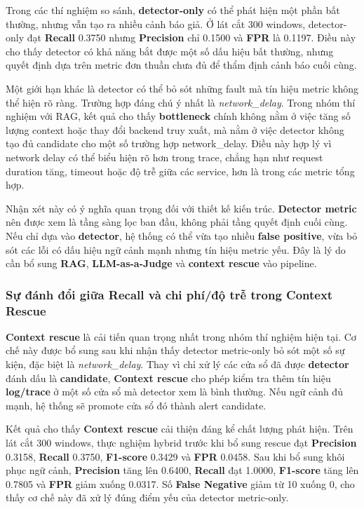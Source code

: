 Trong các thí nghiệm so sánh, \textbf{detector-only} có thể phát hiện một phần bất thường, nhưng vẫn tạo ra nhiều cảnh báo giả. Ở lát cắt 300 windows, detector-only đạt \textbf{Recall} 0.3750 nhưng \textbf{Precision} chỉ 0.1500 và \textbf{FPR} là 0.1197. Điều này cho thấy detector có khả năng bắt được một số dấu hiệu bất thường, nhưng quyết định dựa trên metric đơn thuần chưa đủ để thẩm định cảnh báo cuối cùng.

Một giới hạn khác là detector có thể bỏ sót những fault mà tín hiệu metric không thể hiện rõ ràng. Trường hợp đáng chú ý nhất là \textit{network\_delay}. Trong nhóm thí nghiệm với RAG, kết quả cho thấy \textbf{bottleneck} chính không nằm ở việc tăng số lượng context hoặc thay đổi backend truy xuất, mà nằm ở việc detector không tạo đủ candidate cho một số trường hợp network\_delay. Điều này hợp lý vì network delay có thể biểu hiện rõ hơn trong trace, chẳng hạn như request duration tăng, timeout hoặc độ trễ giữa các service, hơn là trong các metric tổng hợp.

Nhận xét này có ý nghĩa quan trọng đối với thiết kế kiến trúc. \textbf{Detector metric} nên được xem là tầng sàng lọc ban đầu, không phải tầng quyết định cuối cùng. Nếu chỉ dựa vào \textbf{detector}, hệ thống có thể vừa tạo nhiều \textbf{false positive}, vừa bỏ sót các lỗi có dấu hiệu ngữ cảnh mạnh nhưng tín hiệu metric yếu. Đây là lý do cần bổ sung \textbf{RAG}, \textbf{LLM-as-a-Judge} và \textbf{context rescue} vào pipeline.
\subsubsection{
Sự đánh đổi giữa Recall và chi phí/độ trễ trong Context Rescue}

\textbf{Context rescue} là cải tiến quan trọng nhất trong nhóm thí nghiệm hiện tại. Cơ chế này được bổ sung sau khi nhận thấy detector metric-only bỏ sót một số sự kiện, đặc biệt là \textit{network\_delay}. Thay vì chỉ xử lý các cửa sổ đã được \textbf{detector} đánh dấu là \textbf{candidate}, \textbf{Context rescue} cho phép kiểm tra thêm tín hiệu \textbf{log/trace} ở một số cửa sổ mà detector xem là bình thường. Nếu ngữ cảnh đủ mạnh, hệ thống sẽ promote cửa sổ đó thành alert candidate.

Kết quả cho thấy \textbf{Context rescue} cải thiện đáng kể chất lượng phát hiện. Trên lát cắt 300 windows, thực nghiệm hybrid trước khi bổ sung rescue đạt \textbf{Precision} 0.3158, \textbf{Recall} 0.3750, \textbf{F1-score} 0.3429 và \textbf{FPR} 0.0458. Sau khi bổ sung khôi phục ngữ cảnh, \textbf{Precision} tăng lên 0.6400, \textbf{Recall} đạt 1.0000, \textbf{F1-score} tăng lên 0.7805 và \textbf{FPR} giảm xuống 0.0317. Số \textbf{False Negative} giảm từ 10 xuống 0, cho thấy cơ chế này đã xử lý đúng điểm yếu của detector metric-only.


